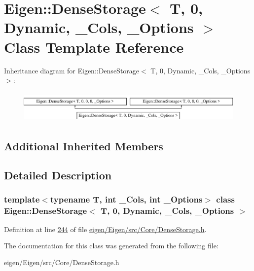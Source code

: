 \hypertarget{class_eigen_1_1_dense_storage_3_01_t_00_010_00_01_dynamic_00_01___cols_00_01___options_01_4}{}\section{Eigen\+:\+:Dense\+Storage$<$ T, 0, Dynamic, \+\_\+\+Cols, \+\_\+\+Options $>$ Class Template Reference}
\label{class_eigen_1_1_dense_storage_3_01_t_00_010_00_01_dynamic_00_01___cols_00_01___options_01_4}
Inheritance diagram for Eigen\+:\+:Dense\+Storage$<$ T, 0, Dynamic, \+\_\+\+Cols, \+\_\+\+Options $>$\+:\begin{figure}[H]
\begin{center}
\leavevmode
\includegraphics[height=1.632653cm]{class_eigen_1_1_dense_storage_3_01_t_00_010_00_01_dynamic_00_01___cols_00_01___options_01_4}
\end{center}
\end{figure}
\subsection*{Additional Inherited Members}


\subsection{Detailed Description}
\subsubsection*{template$<$typename T, int \+\_\+\+Cols, int \+\_\+\+Options$>$\newline
class Eigen\+::\+Dense\+Storage$<$ T, 0, Dynamic, \+\_\+\+Cols, \+\_\+\+Options $>$}



Definition at line \hyperlink{eigen_2_eigen_2src_2_core_2_dense_storage_8h_source_l00244}{244} of file \hyperlink{eigen_2_eigen_2src_2_core_2_dense_storage_8h_source}{eigen/\+Eigen/src/\+Core/\+Dense\+Storage.\+h}.



The documentation for this class was generated from the following file\+:\begin{DoxyCompactItemize}
\item 
eigen/\+Eigen/src/\+Core/\+Dense\+Storage.\+h\end{DoxyCompactItemize}
